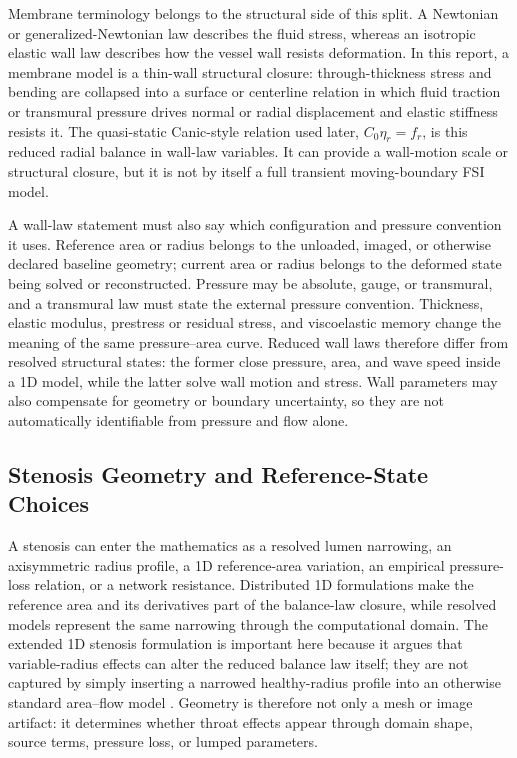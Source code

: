 Membrane terminology belongs to the structural side of this split. A Newtonian
or generalized-Newtonian law describes the fluid stress, whereas an isotropic
elastic wall law describes how the vessel wall resists deformation. In this
report, a membrane model is a thin-wall structural closure: through-thickness
stress and bending are collapsed into a surface or centerline relation in which
fluid traction or transmural pressure drives normal or radial displacement and
elastic stiffness resists it. The quasi-static Canic-style relation used later,
$C_0\eta_r=f_r$, is this reduced radial balance in wall-law variables. It can
provide a wall-motion scale or structural closure, but it is not by itself a
full transient moving-boundary FSI model.

A wall-law statement must also say which configuration and pressure convention
it uses. Reference area or radius belongs to the unloaded, imaged, or otherwise
declared baseline geometry; current area or radius belongs to the deformed
state being solved or reconstructed. Pressure may be absolute, gauge, or
transmural, and a transmural law must state the external pressure convention.
Thickness, elastic modulus, prestress or residual stress, and viscoelastic
memory change the meaning of the same pressure--area curve. Reduced wall laws
therefore differ from resolved structural states: the former close pressure,
area, and wave speed inside a 1D model, while the latter solve wall motion and
stress. Wall parameters may also compensate for geometry or boundary
uncertainty, so they are not automatically identifiable from pressure and flow
alone.

\subsection{Stenosis Geometry and Reference-State Choices}
\label{subsec:geometry-boundary-observable-closures}

A stenosis can enter the mathematics as a resolved lumen narrowing, an
axisymmetric radius profile, a 1D reference-area variation, an empirical
pressure-loss relation, or a network resistance. Distributed 1D formulations
make the reference area and its derivatives part of the balance-law closure,
while resolved models represent the same narrowing through the computational
domain. The extended 1D stenosis formulation is important here because it
argues that variable-radius effects can alter the reduced balance law itself;
they are not captured by simply inserting a narrowed healthy-radius profile
into an otherwise standard area--flow model
\cite{CanicEtAl2024Extended1DStenosis}. Geometry is therefore not only a mesh
or image artifact: it determines whether throat effects appear through domain
shape, source terms, pressure loss, or lumped parameters.


